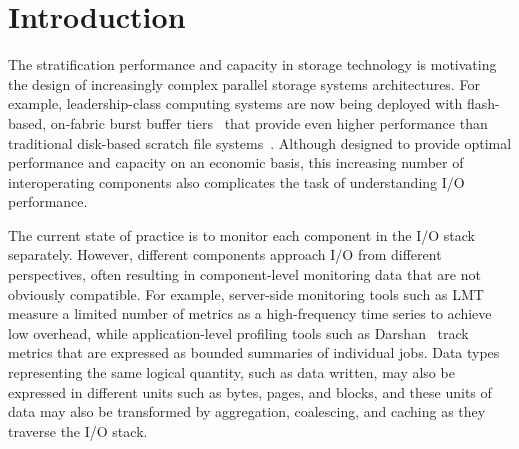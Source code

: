 \section{Introduction} \label{sec:introduction}



The stratification performance and capacity in storage technology is motivating the design of increasingly complex parallel storage systems architectures.
For example, leadership-class computing systems are now being deployed with flash-based, on-fabric burst buffer tiers~\cite{Henseler2016} that provide even higher performance than traditional disk-based scratch file systems~\cite{Bhimji2016}.
Although designed to provide optimal performance and capacity on an economic basis, this increasing number of interoperating components also complicates the task of understanding I/O performance.


The current state of practice is to monitor each component in the I/O stack separately.
However, different components approach I/O from different perspectives, often resulting in component-level monitoring data that are not obviously compatible.
For example, server-side monitoring tools such as LMT~\cite{lmt} measure a limited number of metrics as a high-frequency time series to achieve low overhead, while application-level profiling tools such as Darshan~\cite{carns200924} track metrics that are expressed as bounded
summaries of individual jobs.
Data types representing the same logical quantity, such as data written, may also be expressed in different units such as bytes, pages, and blocks, and these units of data may also be transformed by aggregation, coalescing, and caching as they traverse the I/O stack.


